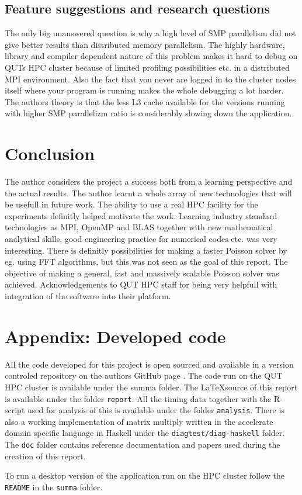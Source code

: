 \documentclass{article}
\begin{document}
\subsection{Feature suggestions and research questions}
The only big unanswered question is why a high level of SMP parallelism did not give better
results than distributed memory parallelism. The highly hardware,
library and compiler dependent nature of this problem makes it hard
to debug on QUTs HPC cluster because of limited profiling possibilities
etc. in a distributed MPI environment. Also the fact that you never are
logged in to the cluster nodes itself where your program is running makes
the whole debugging a lot harder. The authors theory is that the less L3
cache available for the versions running with higher SMP parallelizm ratio
is considerably slowing down the application.

\section{Conclusion}
The author considers the project a success both from a learning perspective and
the actual results. The author learnt a whole array of new technologies that
will be usefull in future work. The ability to use a real HPC facility for the
experiments definitly helped motivate the work. Learning industry
standard technologies as MPI, OpenMP and BLAS together with new mathematical
analytical skills, good engineering practice for numerical codes etc. was
very interesting. There is definitly possibilities for making a faster Poisson
solver by eg. using FFT algorithms, but this was not seen as the goal of
this report. The objective of making a general, fast and massively scalable
Poisson solver was achieved. Acknowledgements to QUT HPC staff for being
very helpfull with integration of the software into their platform.

\section{Appendix: Developed code}
All the code developed for this project is open sourced and available
in a version controled repository on the authors GitHub page \cite{github}.
The code run on the QUT HPC cluster is available under the summa folder. The \LaTeX source of this
report is available under the folder \verb+report+. All the timing data together with the R-script used
for analysis of this is available under the folder \verb+analysis+. There is also a working implementation of
matrix multiply written in the accelerate domain specific language in Haskell under the \verb+diagtest/diag-haskell+
folder. The \verb+doc+ folder contains reference documentation and papers used during the creation of this report.
\begin{em}To run a desktop version of the application run on the HPC cluster follow the \verb+README+ in the \verb+summa+ folder.\end{em}
\end{document}
